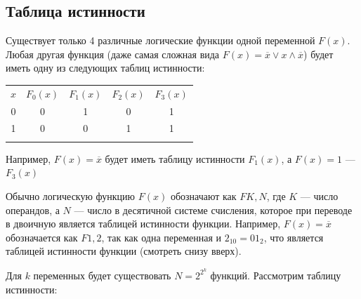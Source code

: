 \subsection{Таблица истинности}\label{subsec:truth-table}

Существует только 4 различные логические функции одной переменной $F(x)$.
Любая другая функция (даже самая сложная вида $F(x) = \overline{x} \vee x \wedge \overline{x}$) будет иметь одну из следующих таблиц истинности:
\begin{table}[H]
    \centering
    \renewcommand{\arraystretch}{1}
    \begin{tabular}{|c||c|c|c|c|}
        \hhline{-||----}
        $x$ & $F_0(x)$ & $F_1(x)$ & $F_2(x)$ & $F_3(x)$ \\
        \hhline{=::====}
        0 & 0 & 1 & 0 & 1 \\
        \hhline{-||----}
        1 & 0 & 0 & 1 & 1 \\
        \hhline{-||----}
    \end{tabular}
\end{table}

\noindent
Например, $F(x) = \overline{x}$ будет иметь таблицу истинности $F_1(x)$, а $F(x) = 1$ --- $F_3(x)$


Обычно логическую функцию $F(x)$ обозначают как $FK,N$, где $K$ --- число операндов, а $N$ --- число в десятичной системе счисления, которое при переводе в двоичную является таблицей истинности функции.
Например, $F(x) = \overline{x}$ обозначается как $F1,2$, так как одна переменная и $2_{10} = 01_{2}$, что является таблицей истинности функции (смотреть снизу вверх).

\bigskip
Для $k$ переменных будет существовать $N = 2^{2^{k}}$ функций. Рассмотрим таблицу истинности:

